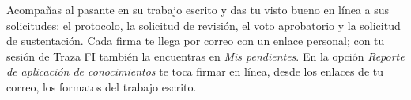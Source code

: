 \documentclass[11pt,a4paper]{article}
\begin{document}
{\small\tableofcontents}
\newpage
\begin{quevasahacer}
Acompañas al pasante en su trabajo escrito y das tu visto bueno en línea a sus solicitudes: el protocolo, la solicitud de revisión, el voto aprobatorio y la solicitud de sustentación. Cada firma te llega por correo con un enlace personal; con tu sesión de Traza FI también la encuentras en \emph{Mis pendientes}. En la opción \emph{Reporte de aplicación de conocimientos} te toca firmar en línea, desde los enlaces de tu correo, los formatos del trabajo escrito.
\end{quevasahacer}



\end{document}
